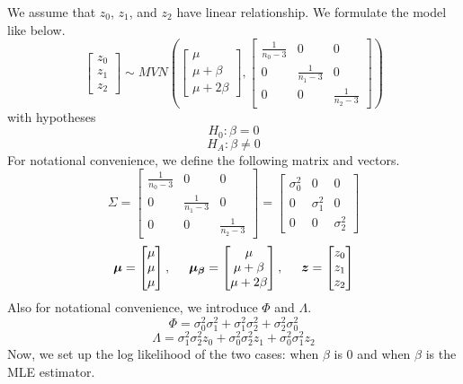\documentclass[11pt]{article}
\begin{document}
\noindent We assume that $z_0$, $z_1$, and $z_2$ have linear relationship. We formulate the model like below.
$$\begin{bmatrix} z_0 \\ z_1 \\ z_2 \end{bmatrix}
\sim MVN \left(
\begin{bmatrix} \mu \\ \mu+\beta \\ \mu+2\beta \end{bmatrix},
\begin{bmatrix}
\frac{1}{n_0-3} & 0 & 0\\
0 & \frac{1}{n_1-3} & 0\\
0 & 0 & \frac{1}{n_2-3}
\end{bmatrix} \right)$$
with hypotheses
$$H_0: \beta = 0$$
$$H_A: \beta \neq 0$$
\noindent For notational convenience, we define the following matrix and vectors.
$$\Sigma = \begin{bmatrix}
\frac{1}{n_0-3} & 0 & 0\\
0 & \frac{1}{n_1-3} & 0\\
0 & 0 & \frac{1}{n_2-3}
\end{bmatrix} = \begin{bmatrix}
\sigma_0^2 & 0 & 0\\
0 & \sigma_1^2 & 0\\
0 & 0 & \sigma_2^2
\end{bmatrix} $$
$$\bm{\mu} = \begin{bmatrix} \mu \\ \mu \\ \mu \end{bmatrix}, \hspace{5mm} \bm{\mu_{\beta}} = \begin{bmatrix} \mu \\ \mu + \beta \\ \mu+2\beta \end{bmatrix}, \hspace{5mm} \bm{z} = \begin{bmatrix} z_0 \\ z_1 \\ z_2 \end{bmatrix}$$
\noindent Also for notational convenience, we introduce $\Phi$ and $\Lambda$. 
$$ \Phi = \sigma_0^2 \sigma_1^2 + \sigma_1^2 \sigma_2^2 + \sigma_2^2 \sigma_0^2$$
$$\Lambda = \sigma_1^2 \sigma_2^2 z_0 + \sigma_0^2 \sigma_2^2 z_1 +\sigma_0^2 \sigma_1^2 z_2$$
\noindent Now, we set up the log likelihood of the two cases: when $\beta$ is 0 and when $\beta$ is the MLE estimator.
\end{document}
